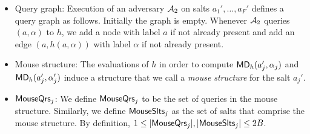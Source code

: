 \begin{itemize}
    For a function $h:[N]\times [M]\to [N]$, consider the following directed graph: it has $N$ nodes labelled with elements of $[N]$ and each node has exactly $M$ outgoing edges, each labelled with elements of $[M]$. There is an edge from node $a_i$ to $a_j$ labelled $\alpha$ if and only if $h(a_i,\alpha)=a_j$.
\item Query graph:
    Execution of an adversary $\mathcal{A}_2$ on salts $a_1',\ldots,a_F'$ defines a query graph as follows. Initially the graph is empty. Whenever  $\mathcal{A}_2$ queries $(a,\alpha)$ to $h$, we add a node with label $a$ if not already present and add an edge $(a,h(a,\alpha))$ with label $\alpha$ if not already present.
    \item Mouse structure:
    The evaluations of $h$ in order to compute $\mathsf{MD}_h(a_j',\alpha_j)$ and $\mathsf{MD}_h(a_j',\alpha_j')$ induce a structure that we call a \emph{mouse structure} for the salt $a_j'$.
    \item $\mathsf{MouseQrs}_j$: We define $\mathsf{MouseQrs}_j$ to be the set of queries in the mouse structure. Similarly, we define  $\mathsf{MouseSlts}_j$ as the set of salts that comprise the mouse structure. By definition, $1\leq |\mathsf{MouseQrs}_j|, |\mathsf{MouseSlts}_j|\leq 2B$. 
    

\end{itemize}
